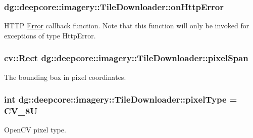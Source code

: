 \subsubsection[{\texorpdfstring{on\+Http\+Error}{onHttpError}}]{ dg\+::deepcore\+::imagery\+::\+Tile\+Downloader\+::on\+Http\+Error}\hypertarget{structdg_1_1deepcore_1_1imagery_1_1_tile_downloader_a98c544a47086337b9c92c189c5cbe6d4}{}\label{structdg_1_1deepcore_1_1imagery_1_1_tile_downloader_a98c544a47086337b9c92c189c5cbe6d4}


H\+T\+TP \hyperlink{classdg_1_1deepcore_1_1_error}{Error} callback function. Note that this function will only be invoked for exceptions of type Http\+Error. 

\subsubsection[{\texorpdfstring{pixel\+Span}{pixelSpan}}]{\setlength{\rightskip}{0pt plus 5cm}cv\+::\+Rect dg\+::deepcore\+::imagery\+::\+Tile\+Downloader\+::pixel\+Span}\hypertarget{structdg_1_1deepcore_1_1imagery_1_1_tile_downloader_a34151548b03536061442aefb2decd4f2}{}\label{structdg_1_1deepcore_1_1imagery_1_1_tile_downloader_a34151548b03536061442aefb2decd4f2}


The bounding box in pixel coordinates. 

\subsubsection[{\texorpdfstring{pixel\+Type}{pixelType}}]{\setlength{\rightskip}{0pt plus 5cm}int dg\+::deepcore\+::imagery\+::\+Tile\+Downloader\+::pixel\+Type = C\+V\+\_\+8U}\hypertarget{structdg_1_1deepcore_1_1imagery_1_1_tile_downloader_ae1ce289c04410240e1232c2859491ed5}{}\label{structdg_1_1deepcore_1_1imagery_1_1_tile_downloader_ae1ce289c04410240e1232c2859491ed5}


Open\+CV pixel type. 

